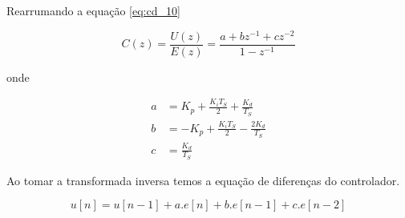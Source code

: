 Rearrumando a equação \ref{eq:cd_10}

\begin{equation}
    \label{eq:cd_11}
    C(z) = \frac{U(z)}{E(z)} = \frac{a+bz^{-1}+cz^{-2}}{1-z^{-1}}
\end{equation}

onde

\begin{align}
  a &= K_p + \frac{K_iT_S}{2} + \frac{K_d}{T_S} \nonumber\\
  b &= -K_p + \frac{K_iT_S}{2} - \frac{2K_d}{T_S} \nonumber\\
  c &= \frac{K_d}{T_S} \nonumber
\end{align}

Ao tomar a transformada inversa temos a equação de diferenças do controlador.

\begin{equation}
    \label{eq:cd_12}
    u[n] = u[n-1] + a.e[n] + b.e[n-1]+c.e[n-2]
\end{equation}